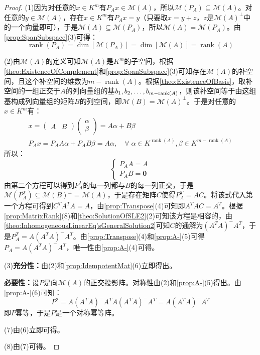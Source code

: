 \begin{proof}
	(1)因为对任意的$x\in K^m$有$P_Ax\in\mathcal{M}(A)$，所以$\mathcal{M}(P_A)\subseteq\mathcal{M}(A)$。对任意的$y\in\mathcal{M}(A)$，存在$x\in K^m$有$P_Ax=y$（只要取$x=y+z$，$z$是$\mathcal{M}(A)^\perp$中的一个向量即可），于是$\mathcal{M}(A)\subseteq\mathcal{M}(P_A)$，所以$\mathcal{M}(A)=\mathcal{M}(P_A)$。由\cref{prop:SpanSubspace}(3)可得：
	\begin{equation*}
		\operatorname{rank}(P_A)=\dim[\mathcal{M}(P_A)]=\dim[\mathcal{M}(A)]=\operatorname{rank}(A)
	\end{equation*}\par
	(2)由$\mathcal{M}(A)$的定义可知$\mathcal{M}(A)$是$K^m$的子空间，根据\cref{theo:ExistenceOfComplement}和\cref{prop:SpanSubspace}(3)可知存在$\mathcal{M}(A)$的补空间，且这个补空间的维数为$m-\operatorname{rank}(A)$。根据\cref{theo:ExistenceOfBasis}，取补空间的一组正交于$A$的列向量组的基$b_1, b_2, \dots, b_{m-\operatorname{rank}(A)}$，则该补空间等于由这组基构成列向量组的矩阵$B$的列空间，即$\mathcal{M}(B)=\mathcal{M}(A)^\perp$。于是对任意的$x\in K^m$有：
	\begin{gather*}
		x=
		\begin{pmatrix}
			A & B
		\end{pmatrix}
		\begin{pmatrix}
			\alpha \\
			\beta
		\end{pmatrix}=A\alpha+B\beta \\
		P_Ax=P_AA\alpha+P_AB\beta=A\alpha,\quad\forall\;\alpha\in K^{\operatorname{rank}(A)},\beta\in K^{m-\operatorname{rank}(A)}
	\end{gather*}
	所以：
	\begin{equation*}
		\begin{cases}
			P_AA=A \\
			P_AB=\mathbf{0}
		\end{cases}
	\end{equation*}
	由第二个方程可以得到$P_A^T$的每一列都与$B$的每一列正交，于是$\mathcal{M}(P_A^T)\subseteq\mathcal{M}(B)^\perp=\mathcal{M}(A)$，于是存在矩阵$C$使得$P_A^T=AC$。将该式代入第一个方程可得到$C^TA^TA=A$，由\cref{prop:Transpose}(4)可知即$A^TAC=A^T$。根据\cref{prop:MatrixRank}(8)和\cref{theo:SolutionOfSLE2}(2)可知该方程是相容的，由\cref{theo:InhomogeneousLinearEq'sGeneralSolution2}可知$C$的通解为$(A^TA)^-A^T$，于是$P_A^T=A(A^TA)^-A^T$。由\cref{prop:Transpose}(4)和\cref{prop:A-}(5)可得$P_A=A(A^TA)^-A^T$，唯一性由\cref{prop:A-}(4)可得。\par
	(3)\textbf{充分性：}由(2)和\cref{prop:IdempotentMat}(6)立即得出。\par
	\textbf{必要性：}设$P$是向$\mathcal{M}(A)$的正交投影阵。对称性由(2)和\cref{prop:A-}(5)得出。由\cref{prop:A-}(6)可知：
	\begin{equation*}
		P^2=A(A^TA)^-A^TA(A^TA)^-A^T=A(A^TA)^-A^T
	\end{equation*}
	即$P$幂等，于是$P$是一个对称幂等阵。\par
	(7)由(6)立即可得。\par
	(8)由(7)可得。
\end{proof}

